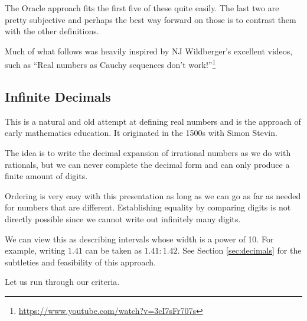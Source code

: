 \documentclass[12pt]{article}
\begin{document}
The Oracle approach fits the first five of these quite easily. The last two are pretty subjective and perhaps the best way forward on those is to contrast them with the other definitions. 

Much of what follows was heavily inspired by NJ Wildberger's excellent videos, such as ``Real numbers as Cauchy sequences don't work!''\footnote{\url{https://www.youtube.com/watch?v=3cI7sFr707s}}


\subsection{Infinite Decimals}

This is a natural and old attempt at defining real numbers and is the approach of early mathematics education. It originated in the 1500s with Simon Stevin. 

The idea is to write the decimal expansion of irrational numbers as we do with rationals, but we can never complete the decimal form and can only produce a finite amount of digits. 

Ordering is very easy with this presentation as long as we can go as far as needed for numbers that are different. Establishing equality by comparing digits is not directly possible since we cannot write out infinitely many digits. 

We can view this as describing intervals whose width is a power of 10. For example, writing $1.41$ can be taken as $1.41:1.42$. See Section \ref{sec:decimals} for the subtleties and feasibility of this approach. 

Let us run through our criteria. 
\end{document}
